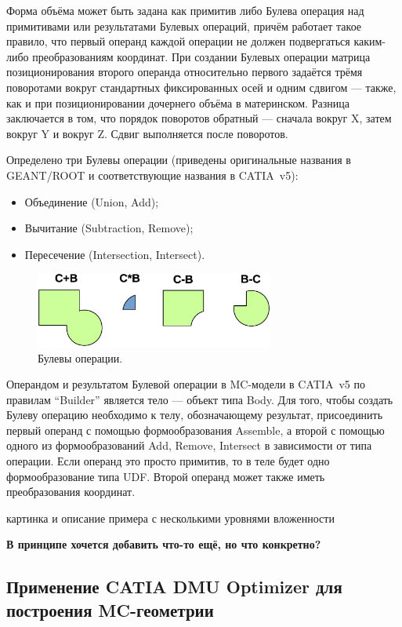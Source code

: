 Форма объёма может быть задана как примитив либо Булева операция над примитивами или результатами Булевых операций, причём работает такое правило, что первый операнд каждой операции не должен подвергаться каким-либо преобразованиям координат. При создании Булевых операции матрица позиционирования второго операнда относительно первого задаётся трёмя поворотами вокруг стандартных фиксированных осей и одним сдвигом --- также, как и при позиционировании дочернего объёма в материнском. Разница заключается в том, что порядок поворотов обратный --- сначала вокруг X, затем вокруг Y и вокруг Z. Сдвиг выполняется после поворотов.

Определено три Булевы операции (приведены оригинальные названия в GEANT/ROOT и соответствующие названия в CATIA~v5):

\begin{itemize}
\item{Объединение (Union, Add);}
\item{Вычитание (Subtraction, Remove);}
\item{Пересечение (Intersection, Intersect).}
\end{itemize}

\begin{figure}[H]
\centering
\includegraphics[width=0.7\textwidth]{pictures/Boolean.eps}
\caption{Булевы операции.}
\label{fig:Boolean}
\end{figure}

Операндом и результатом Булевой операции в MC-модели в CATIA~v5 по правилам ``Builder'' является тело --- объект типа Body. Для того, чтобы создать Булеву операцию необходимо к телу, обозначающему результат, присоединить первый операнд с помощью формообразования Assemble, а второй с помощью одного из формообразований Add, Remove, Intersect в зависимости от типа операции. Если операнд это просто примитив, то в теле будет одно формообразование типа UDF. Второй операнд может также иметь преобразования координат.

\todo картинка и описание примера с несколькими уровнями вложенности

\todo \textbf{В принципе хочется добавить что-то ещё, но что конкретно?}

\subsection{Применение CATIA DMU Optimizer для построения MC-геометрии}\label{sec:CATIAoptimize}

